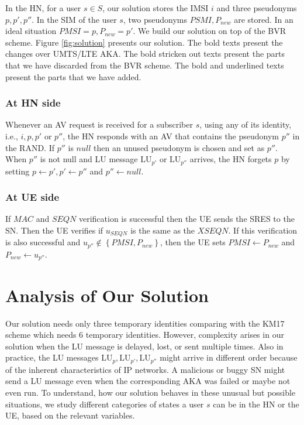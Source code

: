 \documentclass{llncs} %
\begin{document}
In the HN, for a user $s \in S$, our solution stores the IMSI $i$ and three pseudonyms $p,p',p''$. In the SIM of the user $s$, two pseudonyms $PSMI,P_{new}$ are stored. In an ideal situation $PMSI = p, P_{new} = p'$. We build our solution on top of the BVR scheme. Figure \ref{fig:solution} presents our solution. The bold texts present the changes over UMTS/LTE AKA. The bold stricken out texts present the parts that we have discarded from the BVR scheme. The bold and underlined texts present the parts that we have added. 


\subsubsection{At HN side}
Whenever an AV request is received for a subscriber $s$, using any of its identity, i.e., $i,p,p'$ or $p''$, the HN responds with an AV that contains the pseudonym $p''$ in the RAND. If $p''$ is $null$ then an unused pseudonym is chosen and set as $p''$. When $p''$ is not null and LU message $\text{LU}_{p'}$ or $\text{LU}_{p''}$ arrives, the HN forgets $p$ by setting $p \leftarrow p', p' \leftarrow p''$ and $p'' \leftarrow null$. 


\subsubsection{At UE side}
If $MAC$ and $SEQN$ verification is successful then the UE sends the SRES to the SN. Then the UE verifies if $u_{SEQN}$ is the same as the $XSEQN$. If this verification is also successful and $u_{p''} \notin \left\lbrace PMSI,P_{new} \right\rbrace$, then the UE sets $PMSI \leftarrow P_{new}$ and $P_{new} \leftarrow u_{p''}$.


\section{Analysis of Our Solution}
Our solution needs only three temporary identities comparing with the KM17 scheme which needs 6 temporary identities. However, complexity arises in our solution when the LU message is delayed, lost, or sent multiple times. Also in practice, the LU messages $\text{LU}_p,\text{LU}_{p'},\text{LU}_{p''}$ might arrive in different order because of the inherent characteristics of IP networks. A malicious or buggy SN might send a LU message even when the corresponding AKA was failed or maybe not even run. To understand, how our solution behaves in these unusual but possible situations, we study different categories of states a user $s$ can be in the HN or the UE, based on the relevant variables.  
\end{document}
